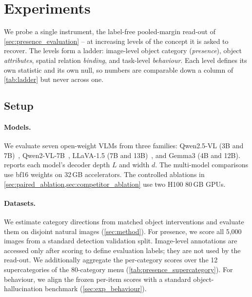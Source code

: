 \section{Experiments}

We probe a single instrument, the label-free pooled-margin read-out of
\cref{sec:presence_evaluation} -- at increasing levels of the concept it is
asked to recover. The levels form a ladder: image-level object category
(\emph{presence}), object \emph{attributes}, spatial relation \emph{binding},
and task-level \emph{behaviour}. Each level defines its own statistic and its
own null, so numbers are comparable down a column of \cref{tab:ladder} but
never across one.

\subsection{Setup}
\label{sec:exp_setup}

\paragraph{Models.}
We evaluate seven open-weight VLMs from three families: Qwen2.5-VL
(3B and 7B)~\cite{BaiEtAl2025Qwen25VL},
Qwen2-VL-7B~\cite{WangEtAl2024Qwen2VL}, LLaVA-1.5 (7B and
13B)~\cite{LiuEtAl2023LLaVA}, and Gemma3 (4B and 12B).
 reports each model's decoder depth $L$ and width $d$.
The multi-model comparisons use bf16 weights on 32\,GB accelerators.
The controlled ablations in \cref{sec:paired_ablation,sec:competitor_ablation}
use two H100 80\,GB GPUs.

\paragraph{Datasets.}
We estimate category directions from matched object interventions and
evaluate them on disjoint natural images (\cref{sec:method}). For presence,
we score all 5,000 images from a standard detection validation split.
Image-level annotations are accessed only after scoring to define evaluation
labels; they are not used by the read-out. We additionally aggregate the
per-category scores over the 12 supercategories of the 80-category menu
(\cref{tab:presence_supercategory}). For behaviour, we align the frozen
per-item scores with a standard object-hallucination benchmark
(\cref{sec:exp_behaviour}).

